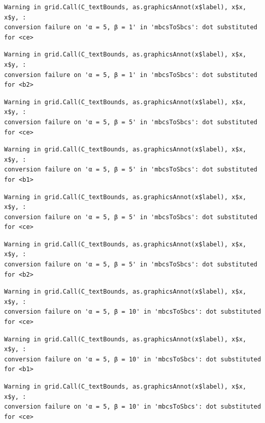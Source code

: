\documentclass[
  spanish,
  a4paper,
]{scrreport}
\theoremstyle{plain}
\theoremstyle{definition}
\theoremstyle{definition}
\theoremstyle{remark}
\begin{document}
\begin{verbatim}
Warning in grid.Call(C_textBounds, as.graphicsAnnot(x$label), x$x, x$y, :
conversion failure on 'α = 5, β = 1' in 'mbcsToSbcs': dot substituted for <ce>
\end{verbatim}

\begin{verbatim}
Warning in grid.Call(C_textBounds, as.graphicsAnnot(x$label), x$x, x$y, :
conversion failure on 'α = 5, β = 1' in 'mbcsToSbcs': dot substituted for <b2>
\end{verbatim}

\begin{verbatim}
Warning in grid.Call(C_textBounds, as.graphicsAnnot(x$label), x$x, x$y, :
conversion failure on 'α = 5, β = 5' in 'mbcsToSbcs': dot substituted for <ce>
\end{verbatim}

\begin{verbatim}
Warning in grid.Call(C_textBounds, as.graphicsAnnot(x$label), x$x, x$y, :
conversion failure on 'α = 5, β = 5' in 'mbcsToSbcs': dot substituted for <b1>
\end{verbatim}

\begin{verbatim}
Warning in grid.Call(C_textBounds, as.graphicsAnnot(x$label), x$x, x$y, :
conversion failure on 'α = 5, β = 5' in 'mbcsToSbcs': dot substituted for <ce>
\end{verbatim}

\begin{verbatim}
Warning in grid.Call(C_textBounds, as.graphicsAnnot(x$label), x$x, x$y, :
conversion failure on 'α = 5, β = 5' in 'mbcsToSbcs': dot substituted for <b2>
\end{verbatim}

\begin{verbatim}
Warning in grid.Call(C_textBounds, as.graphicsAnnot(x$label), x$x, x$y, :
conversion failure on 'α = 5, β = 10' in 'mbcsToSbcs': dot substituted for <ce>
\end{verbatim}

\begin{verbatim}
Warning in grid.Call(C_textBounds, as.graphicsAnnot(x$label), x$x, x$y, :
conversion failure on 'α = 5, β = 10' in 'mbcsToSbcs': dot substituted for <b1>
\end{verbatim}

\begin{verbatim}
Warning in grid.Call(C_textBounds, as.graphicsAnnot(x$label), x$x, x$y, :
conversion failure on 'α = 5, β = 10' in 'mbcsToSbcs': dot substituted for <ce>
\end{verbatim}
\end{document}
